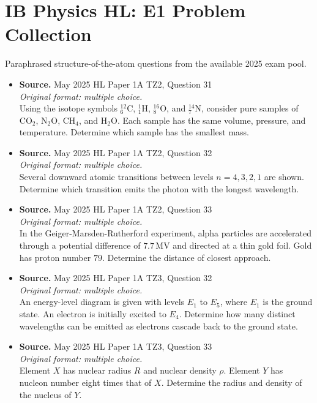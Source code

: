 \documentclass[11pt]{article}
\begin{document}
\section*{IB Physics HL: E1 Problem Collection}
Paraphrased structure-of-the-atom questions from the available 2025 exam pool.
\begin{itemize}[leftmargin=1.25em]
\item
\textbf{Source.} May 2025 HL Paper 1A TZ2, Question 31\\
\textit{Original format: multiple choice.}\\
Using the isotope symbols ${}^{12}_{6}\mathrm{C}$, ${}^{1}_{1}\mathrm{H}$, ${}^{16}_{8}\mathrm{O}$, and ${}^{14}_{7}\mathrm{N}$, consider pure samples of $\mathrm{CO}_2$, $\mathrm{N_2O}$, $\mathrm{CH_4}$, and $\mathrm{H_2O}$. Each sample has the same volume, pressure, and temperature. Determine which sample has the smallest mass.
\item
\textbf{Source.} May 2025 HL Paper 1A TZ2, Question 32\\
\textit{Original format: multiple choice.}\\
Several downward atomic transitions between levels $n=4,3,2,1$ are shown. Determine which transition emits the photon with the longest wavelength.
\item
\textbf{Source.} May 2025 HL Paper 1A TZ2, Question 33\\
\textit{Original format: multiple choice.}\\
In the Geiger-Marsden-Rutherford experiment, alpha particles are accelerated through a potential difference of $7.7\,\text{MV}$ and directed at a thin gold foil. Gold has proton number $79$. Determine the distance of closest approach.
\item
\textbf{Source.} May 2025 HL Paper 1A TZ3, Question 32\\
\textit{Original format: multiple choice.}\\
An energy-level diagram is given with levels $E_1$ to $E_5$, where $E_1$ is the ground state. An electron is initially excited to $E_4$. Determine how many distinct wavelengths can be emitted as electrons cascade back to the ground state.
\item
\textbf{Source.} May 2025 HL Paper 1A TZ3, Question 33\\
\textit{Original format: multiple choice.}\\
Element $X$ has nuclear radius $R$ and nuclear density $\rho$. Element $Y$ has nucleon number eight times that of $X$. Determine the radius and density of the nucleus of $Y$.

\end{itemize}
\end{document}
